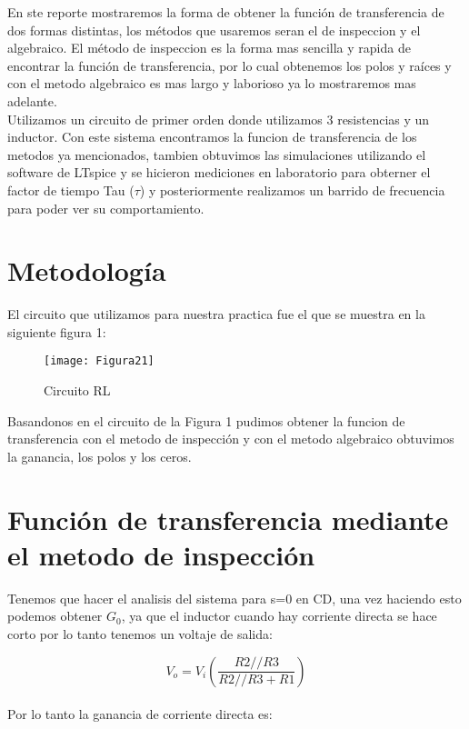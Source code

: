 \documentclass{report}
\newcounter{ns}
\begin{document}
	En ste reporte mostraremos la forma de obtener  la función de transferencia de dos formas distintas, los métodos que usaremos seran el de inspeccion y el algebraico. El método de inspeccion es la forma mas sencilla y rapida de encontrar la función de transferencia, por lo cual obtenemos los polos y raíces y con el metodo algebraico es mas largo y laborioso ya lo mostraremos mas adelante.\\
	
	Utilizamos un circuito de primer orden donde utilizamos 3 resistencias y un inductor. Con este sistema encontramos la funcion de transferencia de los metodos ya mencionados, tambien obtuvimos las simulaciones utilizando el software de LTspice y se hicieron mediciones en laboratorio para obterner el factor de tiempo Tau ($\tau$) y posteriormente realizamos un barrido de frecuencia para poder ver su comportamiento.
	
	\section*{Metodología}
	
	El circuito que utilizamos para nuestra practica fue el que se muestra en la siguiente figura 1:
	
	\begin{figure}[H]
		\centering
		\texttt{[image: Figura21]}
		\caption{Circuito RL}
		\label{fig:figura100}
	\end{figure}	
	
	Basandonos en el circuito de la Figura 1 pudimos obtener la funcion de transferencia con el metodo de inspección y con el metodo algebraico obtuvimos la ganancia, los polos y los ceros.
	
	\section*{Función de transferencia mediante el metodo de inspección}
	
	Tenemos que hacer el analisis del sistema para s=0 en CD, una vez haciendo esto podemos obtener $G_0$, ya que el inductor cuando hay corriente directa se hace corto por lo tanto tenemos un voltaje de salida:
	
	\begin{equation*}
		V_o= V_i\left(\frac{R2//R3}{R2//R3 + R1}\right)
	\end{equation*}\\
	
	Por lo tanto la ganancia de corriente directa es:\\
	
\end{document}
